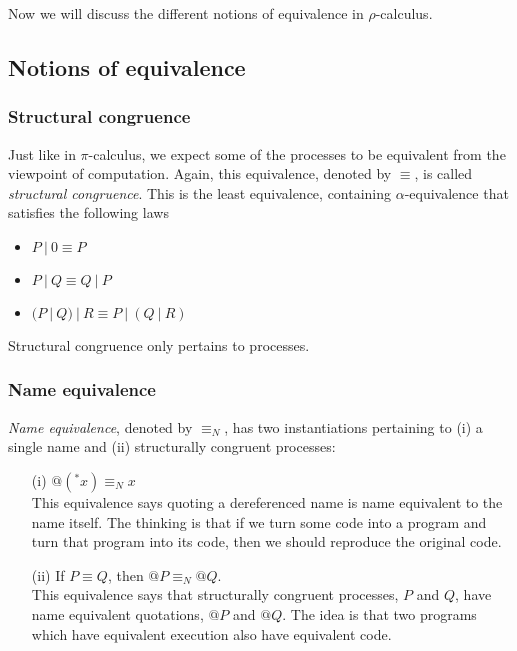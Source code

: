 \documentclass[12pt]{article}
\numberwithin{equation}{section}
\begin{document}
Now we will discuss the different notions of equivalence in $\rho$-calculus.

\subsection{Notions of equivalence}

\subsubsection{Structural congruence}
Just like in $\pi$-calculus, we expect some of the processes to be equivalent from the viewpoint of computation. Again, this equivalence, denoted by $\equiv$, is called \emph{structural congruence}. This is the least equivalence, containing $\alpha$-equivalence that satisfies the following laws
\begin{itemize}
\item $P \ | \ 0 \equiv P$

\item $P \ | \ Q \equiv Q \ | \ P$

\item $(P \ | \ Q) \ | \ R \equiv P \ | \ (Q \ | \ R)$
\end{itemize}

Structural congruence only pertains to processes.

\subsubsection{Name equivalence}
\emph{Name equivalence}, denoted by $\equiv_N$, has two instantiations pertaining to (i) a single name and (ii) structurally congruent processes:
\begin{enumerate}
\item[(i)] $@({}^*x) \equiv_N x$ \\
This equivalence says quoting a dereferenced name is name equivalent to the name itself. The thinking is that if we turn some code into a program and turn that program into its code, then we should reproduce the original code.

\item[(ii)] If $P \equiv Q$, then $@P \equiv_N @Q$. \\
This equivalence says that structurally congruent processes, $P$ and $Q$, have name equivalent quotations, $@P$ and $@Q$. The idea is that two programs which have equivalent execution also have equivalent code.
\end{enumerate}
\end{document}
